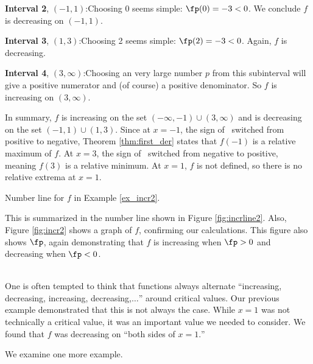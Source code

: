 {\noindent\textbf{Interval 2}, $(-1,1)$:\quad Choosing 0 seems simple: $\fp(0)=-3<0$. We conclude $f$ is decreasing on $(-1,1)$.

\noindent\textbf{Interval 3}, $(1,3)$:\quad Choosing 2 seems simple: $\fp(2) = -3<0$. Again, $f$ is decreasing.

\noindent \textbf{Interval 4}, $(3,\infty)$:\quad	Choosing an very large number $p$ from this subinterval will give a positive numerator and (of course) a positive denominator. So $f$ is increasing on $(3,\infty)$.

In summary, $f$ is increasing on the set $(-\infty,-1)\cup (3,\infty)$ and is decreasing on the set $(-1,1)\cup (1,3)$. Since at $x=-1$, the sign of \fp\ switched from positive to negative, Theorem \ref{thm:first_der} states that $f(-1)$ is a relative maximum of $f$. At $x=3$, the sign of \fp\ switched from negative to positive, meaning $f(3)$ is a relative minimum. At $x=1$, $f$ is not defined, so there is no relative extrema at $x=1$.

\noindent\begin{minipage}{\textwidth}\centering
{}
\captionsetup{type=figure}%
\caption{Number line for $f$ in Example \ref{ex_incr2}.}\label{fig:incrline2}
\end{minipage}
 
This is summarized in the number line shown in Figure \ref{fig:incrline2}. Also, Figure \ref{fig:incr2} shows a graph of $f$, confirming our calculations. This figure also shows $\fp$, again demonstrating that $f$ is increasing when $\fp>0$ and decreasing when $\fp<0$.
}\\

One is often tempted to think that functions always alternate ``increasing, decreasing, increasing, decreasing,$\ldots$'' around critical values. Our previous example demonstrated that this is not always the case. While $x=1$ was not technically a critical value, it was an important value we needed to consider. We found that $f$ was decreasing on ``both sides of $x=1.$''

We examine one more example.\\

